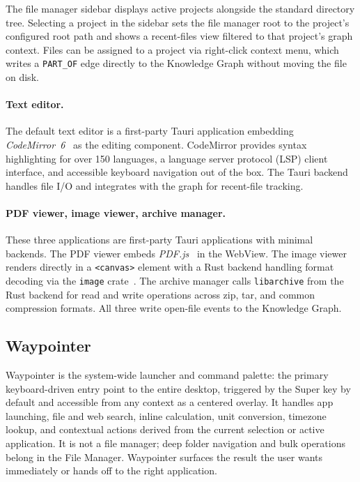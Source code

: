 The file manager sidebar displays active projects alongside the standard
directory tree. Selecting a project in the sidebar sets the file manager
root to the project's configured root path and shows a recent-files view
filtered to that project's graph context. Files can be assigned to a
project via right-click context menu, which writes a \texttt{PART\_OF}
edge directly to the Knowledge Graph without moving the file on disk.

\paragraph{Text editor.}
The default text editor is a first-party Tauri application embedding
\emph{CodeMirror~6}~\cite{codemirror} as the editing component.
CodeMirror provides syntax highlighting for over 150 languages, a
language server protocol (LSP) client interface, and accessible keyboard
navigation out of the box. The Tauri backend handles file I/O and
integrates with the graph for recent-file tracking.

\paragraph{PDF viewer, image viewer, archive manager.}
These three applications are first-party Tauri applications with minimal
backends. The PDF viewer embeds \emph{PDF.js}~\cite{pdfjs} in the
WebView. The image viewer renders directly in a \texttt{<canvas>} element
with a Rust backend handling format decoding via the \texttt{image}
crate~\cite{rust:image}. The archive manager calls \texttt{libarchive}
from the Rust backend for read and write operations across zip, tar, and
common compression formats. All three write open-file events to the
Knowledge Graph.

\subsection{Waypointer}
\label{sec:waypointer}

Waypointer is the system-wide launcher and command palette: the primary
keyboard-driven entry point to the entire desktop, triggered by the Super key
by default and accessible from any context as a centered overlay. It handles
app launching, file and web search, inline calculation, unit conversion,
timezone lookup, and contextual actions derived from the current selection or
active application. It is not a file manager; deep folder navigation and bulk
operations belong in the File Manager. Waypointer surfaces the result the user
wants immediately or hands off to the right application.

